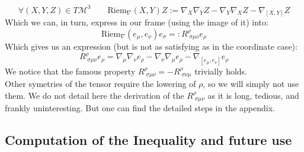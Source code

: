 \documentclass[a4paper,11pt]{article}
\numberwithin{equation}{section}
\theoremstyle{definition}
\begin{document}
\begin{equation}
    \forall (X,Y,Z)\in T\mathcal{M}^3 \quad \quad \mathrm{Riem}_\nabla (X,Y)Z:= \nabla_X\nabla_YZ-\nabla_Y\nabla_XZ-\nabla_{[X,Y]}Z
\end{equation}
Which we can, in turn, express in our frame (using the image of it) into:
$$
\mathrm{Riem}_\nabla (e_\mu,e_\nu)e_\sigma =: R^\rho_{\;\sigma\mu\nu} e_\rho
$$
Which gives us an expression (but is not as satisfying as in the coordinate case):
\begin{equation}
    R^\rho_{\;\sigma\mu\nu} e_\rho = \nabla_\mu\nabla_\nu e_\rho-\nabla_\nu\nabla_\mu e_\rho-\nabla_{[e_\mu,e_\nu]}e_\rho
\end{equation}
We notice that the famous property $R^\rho_{\;\sigma\mu\nu}=-R^\rho_{\;\sigma\nu\mu}$ trivially holds.\\
Other symetries of the tensor require the lowering of $\rho$, so we will simply not use them. We do not detail here the derivation of the $R^\rho_{\;\sigma\mu\nu}$ as it is long, tedious, and frankly uninteresting. But one can find the detailed steps \color{red}in the appendix\color{black}.
\subsection{Computation of the Inequality and future use}
\end{document}
